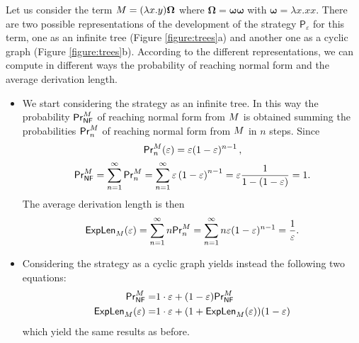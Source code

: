 \begin{example}
	Let us consider the term $M=(\lambda x.y)\bm{\Omega}$ where $\bm{\Omega}=\bm{\omega\omega}$  with $\bm{\omega}=\lambda x.xx$. There are two possible representations of the development of the strategy $\mathsf{P}_\varepsilon$ for this term, one as an infinite tree (Figure \ref{figure:trees}a) and another one as a cyclic graph (Figure \ref{figure:trees}b). According to the different representations, we can compute in different ways the probability of reaching normal form and the average derivation length.
	\begin{itemize}
		\item
		We start considering the strategy as an infinite tree. In this way the probability  $\mathsf{Pr}_{\mathsf{NF}}^{M}$ of reaching normal form from $M$ is obtained summing the probabilities $\mathsf{Pr}_n^{M}$ of reaching normal form from $M$ in $n$ steps. Since
		$$
		\mathsf{Pr}_n^{M}(\varepsilon)=\varepsilon(1-\varepsilon)^{n-1}\,,
		$$
		$$
		\mathsf{Pr}_{\mathsf{NF}}^{M}=\sum_{n=1}^{\infty}\mathsf{Pr}_n^{M}=\sum_{n=1}^{\infty}\varepsilon\left( 1-\varepsilon\right)^{n-1}=\varepsilon\frac{1}{1-(1-\varepsilon)}=1.
		$$
		The average derivation length is then
		$$
		\textsf{ExpLen}_{M}(\varepsilon)=\sum_{n=1}^{\infty}n\mathsf{Pr}_n^{M}= \sum_{n=1}^{\infty}n\varepsilon(1-\varepsilon)^{n-1}=\frac{1}{\varepsilon}.
		$$
		\item
		Considering the strategy as a cyclic graph yields instead the following two equations:
		\begin{equation*}\begin{split}
				\mathsf{Pr}_{\mathsf{NF}}^{M} =& 1\cdot\varepsilon + (1-\varepsilon)\mathsf{Pr}_{\mathsf{NF}}^{M}\\
				\textsf{ExpLen}_{M}(\varepsilon)=& 1\cdot\varepsilon + (1+\textsf{ExpLen}_{M}(\varepsilon))(1-\varepsilon)
			\end{split}\end{equation*}
			which yield the same results as before.
		\end{itemize}
\end{example}
